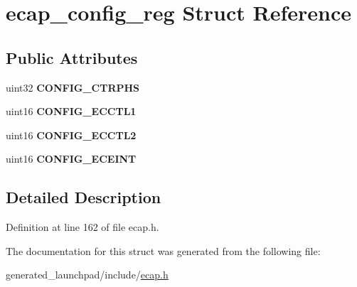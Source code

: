 \hypertarget{structecap__config__reg}{}\section{ecap\+\_\+config\+\_\+reg Struct Reference}
\label{structecap__config__reg}
\subsection*{Public Attributes}
\begin{DoxyCompactItemize}
\item 
\mbox{\label{structecap__config__reg_acbdf7c2066fcf244e6178286c8ebabd3}} 
uint32 {\bfseries C\+O\+N\+F\+I\+G\+\_\+\+C\+T\+R\+P\+HS}
\item 
\mbox{\label{structecap__config__reg_a1046a74da16c1830f17163a98d0b596b}} 
uint16 {\bfseries C\+O\+N\+F\+I\+G\+\_\+\+E\+C\+C\+T\+L1}
\item 
\mbox{\label{structecap__config__reg_a3b5a197e1572a5f51ab0b8e7c58ddee4}} 
uint16 {\bfseries C\+O\+N\+F\+I\+G\+\_\+\+E\+C\+C\+T\+L2}
\item 
\mbox{\label{structecap__config__reg_ab69b2e5e691df4c67044271d0a794fbf}} 
uint16 {\bfseries C\+O\+N\+F\+I\+G\+\_\+\+E\+C\+E\+I\+NT}
\end{DoxyCompactItemize}


\subsection{Detailed Description}


Definition at line 162 of file ecap.\+h.



The documentation for this struct was generated from the following file\+:\begin{DoxyCompactItemize}
\item 
generated\+\_\+launchpad/include/\mbox{\hyperlink{ecap_8h}{ecap.\+h}}\end{DoxyCompactItemize}
